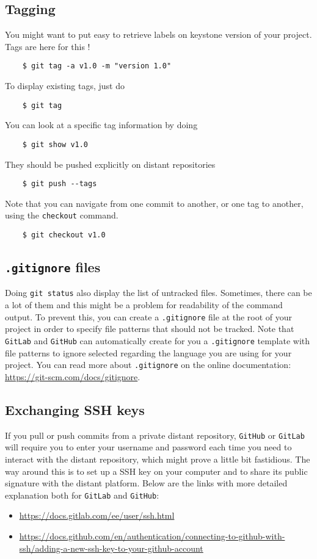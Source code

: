 \documentclass{article}
\begin{document}
\subsection{Tagging}

You might want to put easy to retrieve labels on keystone version of your project. Tags are here for this ! 
\begin{lstlisting}
    $ git tag -a v1.0 -m "version 1.0"
\end{lstlisting}
To display existing tags, just do
\begin{lstlisting}
    $ git tag 
\end{lstlisting}
You can look at a specific tag information by doing
\begin{lstlisting}
    $ git show v1.0
\end{lstlisting}
They should be pushed explicitly on distant repositories 
\begin{lstlisting}
    $ git push --tags
\end{lstlisting}
Note that you can navigate from one commit to another, or one tag to another, using the \texttt{checkout} command.
\begin{lstlisting}
    $ git checkout v1.0
\end{lstlisting}

\subsection{\texttt{.gitignore} files}

Doing \texttt{git status} also display the list of untracked files. Sometimes, there can be a lot of them and this might be a problem for readability of the command output. To prevent this, you can create a \texttt{.gitignore} file at the root of your project in order to specify file patterns that should not be tracked. Note that  \texttt{GitLab} and \texttt{GitHub} can automatically create for you a \texttt{.gitignore} template with file patterns to ignore selected regarding the language you are using for your project. You can read more about \texttt{.gitignore} on the online documentation: \url{https://git-scm.com/docs/gitignore}.

\subsection{Exchanging SSH keys}

If you pull or push commits from a private distant repository, \texttt{GitHub} or \texttt{GitLab} will require you to enter your username and password each time you need to interact with the distant repository, which might prove a little bit fastidious. The way around this is to set up a SSH key on your computer and to share its public signature with the distant platform. Below are the links with more detailed explanation both for \texttt{GitLab} and \texttt{GitHub}:
\begin{itemize}
    \item  \url{https://docs.gitlab.com/ee/user/ssh.html}
    \item \url{https://docs.github.com/en/authentication/connecting-to-github-with-ssh/adding-a-new-ssh-key-to-your-github-account}
\end{itemize}
\end{document}
